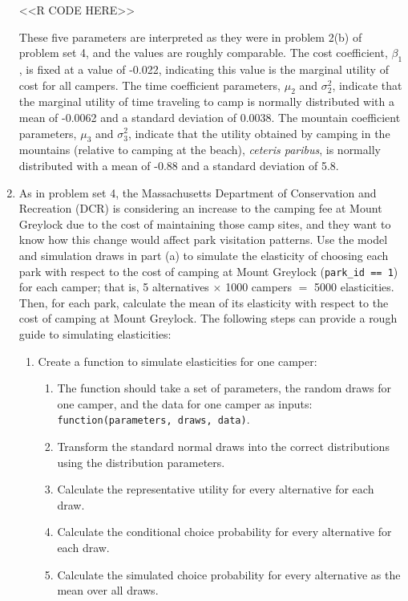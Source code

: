 \documentclass[11pt,letterpaper]{article}
\begin{document}
\begin{enumerate}[label=\alph*., leftmargin=*]
	<<R CODE HERE>>

	These five parameters are interpreted as they were in problem 2(b) of problem set 4, and the values are roughly comparable. The cost coefficient, $\beta_1$, is fixed at a value of -0.022, indicating this value is the marginal utility of cost for all campers. The time coefficient parameters, $\mu_2$ and $\sigma_2^2$, indicate that the marginal utility of time traveling to camp is normally distributed with a mean of -0.0062 and a standard deviation of 0.0038. The mountain coefficient parameters, $\mu_3$ and $\sigma_3^2$, indicate that the utility obtained by camping in the mountains (relative to camping at the beach), \emph{ceteris paribus}, is normally distributed with a mean of -0.88 and a standard deviation of 5.8.

	\item As in problem set 4, the Massachusetts Department of Conservation and Recreation (DCR) is considering an increase to the camping fee at Mount Greylock due to the cost of maintaining those camp sites, and they want to know how this change would affect park visitation patterns. Use the model and simulation draws in part (a) to simulate the elasticity of choosing each park with respect to the cost of camping at Mount Greylock (\texttt{park\_id == 1}) for each camper; that is, 5 alternatives $\times$ 1000 campers $=$ 5000 elasticities. Then, for each park, calculate the mean of its elasticity with respect to the cost of camping at Mount Greylock. The following steps can provide a rough guide to simulating elasticities:
	\begin{enumerate}[label=\Roman*.]
		\item Create a function to simulate elasticities for one camper:
		\begin{enumerate}[label=\roman*.]
			\item The function should take a set of parameters, the random draws for one camper, and the data for one camper as inputs: \texttt{function(parameters, draws, data)}.
			\item Transform the standard normal draws into the correct distributions using the distribution parameters.
			\item Calculate the representative utility for every alternative for each draw.
			\item Calculate the conditional choice probability for every alternative for each draw.
			\item Calculate the simulated choice probability for every alternative as the mean over all draws.

\end{enumerate}
\end{enumerate}
\end{enumerate}
\end{document}
